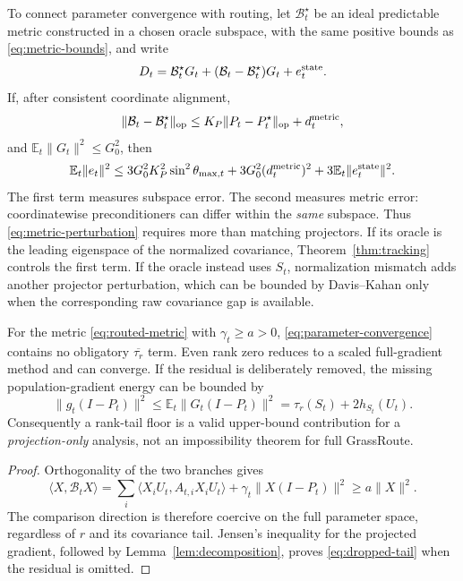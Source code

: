 To connect parameter convergence with routing, let $\mathcal B_t^\star$ be
an ideal predictable metric
constructed in a chosen oracle subspace, with the same positive bounds as
\eqref{eq:metric-bounds}, and write
\begin{equation}
 D_t=\mathcal B_t^\star G_t+
       (\mathcal B_t-\mathcal B_t^\star)G_t+e_t^{\rm state}.
\end{equation}
If, after consistent coordinate alignment,
\begin{equation}
 \|\mathcal B_t-\mathcal B_t^\star\|_{\rm op}
 \le K_P\|P_t-P_t^\star\|_{\rm op}+d_t^{\rm metric},
 \label{eq:metric-perturbation}
\end{equation}
and $\mathbb E_t\|G_t\|^2\le G_0^2$, then
\begin{align}
 \mathbb E_t\|e_t\|^2
 \le 3G_0^2K_P^2\sin^2\theta_{\max,t}
       +3G_0^2(d_t^{\rm metric})^2
       +3\mathbb E_t\|e_t^{\rm state}\|^2.
 \label{eq:tracking-to-convergence}
\end{align}
The first term measures subspace error. The second measures metric error:
coordinatewise preconditioners can differ within the \emph{same} subspace.
Thus \eqref{eq:metric-perturbation} requires more than matching projectors.
If its oracle is the leading eigenspace of the normalized covariance,
Theorem~\ref{thm:tracking} controls the first term. If the oracle instead
uses $S_t$, normalization mismatch adds another projector perturbation,
which can be bounded by Davis--Kahan only when the corresponding raw
covariance gap is available.

\begin{proposition}
\label{prop:no-tail-floor}
For the metric \eqref{eq:routed-metric} with $\gamma_t\ge a>0$,
\eqref{eq:parameter-convergence} contains no obligatory
$\overline{\tau_r}$ term. Even rank zero reduces to a scaled full-gradient
method and can converge. If the residual is deliberately removed,
the missing population-gradient energy can be bounded by
\begin{equation}
 \|g_t(I-P_t)\|^2
 \le\mathbb E_t\|G_t(I-P_t)\|^2
 =\tau_r(S_t)+2h_{S_t}(U_t).\label{eq:dropped-tail}
\end{equation}
Consequently a rank-tail floor is a valid upper-bound contribution for a
\emph{projection-only} analysis, not an impossibility theorem for full
GrassRoute.
\end{proposition}
\begin{proof}
Orthogonality of the two branches gives
\begin{equation}
 \langle X,\mathcal B_tX\rangle
 =\sum_i\langle X_iU_t,A_{t,i}X_iU_t\rangle
       +\gamma_t\|X(I-P_t)\|^2\ge a\|X\|^2.
\end{equation}
The comparison direction is therefore coercive on the full parameter
space, regardless of $r$ and its covariance tail. Jensen's inequality for
the projected gradient, followed by Lemma~\ref{lem:decomposition}, proves
\eqref{eq:dropped-tail} when the residual is omitted.
\end{proof}


